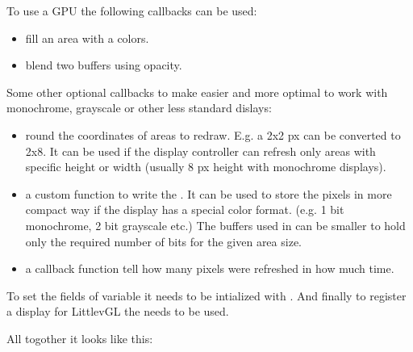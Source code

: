 \documentclass[letterpaper,10pt,english]{sphinxmanual}
\begin{document}
To use a GPU the following callbacks can be used:
\begin{itemize}
\item {} 
 fill an area with a colors.

\item {} 
 blend two buffers using opacity.

\end{itemize}

Some other optional callbacks to make easier and more optimal to work with monochrome, grayscale or other less standard dislays:
\begin{itemize}
\item {} 
 round the coordinates of areas to redraw. E.g. a 2x2 px can be converted to 2x8.
It can be used if the display controller can refresh only areas with specific height or width (usually 8 px height with monochrome displays).

\item {} 
 a custom function to write the .
It can be used to store the pixels in more compact way if the display has a special color format. (e.g. 1 bit monochrome, 2  bit grayscale etc.)
The buffers used in  can be smaller to hold only the required number of bits for the given area size.

\item {} 
 a callback function tell how many pixels were refreshed in how much time.

\end{itemize}

To set the fields of  variable it needs to be intialized with .
And finally to register a display for LittlevGL the  needs to be used.

All togother it looks like this:
\end{document}
